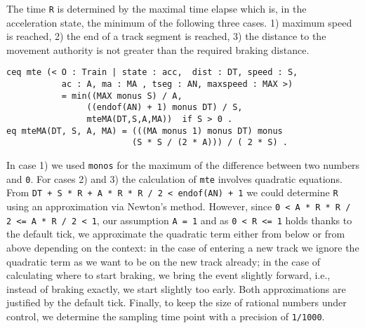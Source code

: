 The time \verb|R| is determined by the maximal time elapse which is,
in the acceleration state, the minimum of the following three
cases. 1) maximum speed is reached, 2) the end of a track segment is
reached, 3) the distance to the movement authority is not greater than
the required braking distance.
\begin{lstlisting}
ceq mte (< O : Train | state : acc,  dist : DT, speed : S, 
           ac : A, ma : MA , tseg : AN, maxspeed : MAX >)
           = min((MAX monus S) / A,
                ((endof(AN) + 1) monus DT) / S,
                mteMA(DT,S,A,MA))  if S > 0 .
eq mteMA(DT, S, A, MA) = (((MA monus 1) monus DT) monus 
                         (S * S / (2 * A))) / ( 2 * S) .
\end{lstlisting}
In case 1) we used \texttt{monos} for the maximum of the difference between two numbers and \texttt{0}. 
For cases 2) and 3) the calculation of \texttt{mte} involves quadratic
equations.  From \texttt{DT + S * R + A * R * R / 2 < endof(AN) + 1} we
could determine \texttt{R} using an approximation via Newton's
method. However, since \texttt{0 < A * R * R / 2 <= A * R / 2 < 1}, our
assumption \texttt{A = 1} and as \texttt{0 < R <= 1} holds thanks to the default
tick, we approximate the quadratic term either from below or from
above depending on the context: in the case of entering a new track we
ignore the quadratic term as we want to be on the new track
already; in the case of calculating where to start braking, we bring
the event slightly forward, i.e., instead of braking exactly, we start
slightly too early. Both approximations are justified by the
default tick. Finally, to keep the size of rational numbers under
control, we determine the sampling time point with a precision of
\texttt{1/1000}.





